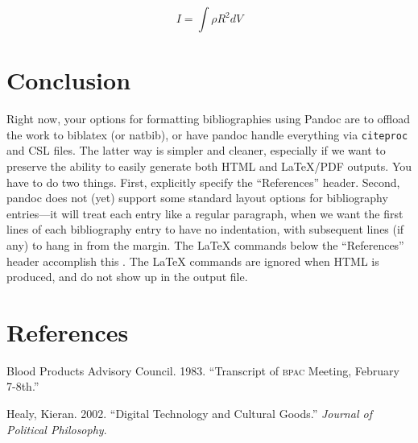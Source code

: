 \documentclass[11pt,article,oneside]{memoir}
\begin{document}
\begin{equation}
I = \int \rho R^{2} dV
\end{equation}

\section{Conclusion}\label{conclusion}

Right now, your options for formatting bibliographies using Pandoc are
to offload the work to biblatex (or natbib), or have pandoc handle
everything via \texttt{citeproc} and CSL files. The latter way is
simpler and cleaner, especially if we want to preserve the ability to
easily generate both HTML and LaTeX/PDF outputs. You have to do two
things. First, explicitly specify the ``References'' header. Second,
pandoc does not (yet) support some standard layout options for
bibliography entries---it will treat each entry like a regular
paragraph, when we want the first lines of each bibliography entry to
have no indentation, with subsequent lines (if any) to hang in from the
margin. The LaTeX commands below the ``References'' header accomplish
this . The LaTeX commands are ignored when HTML is produced, and do not
show up in the output file.

\section{References}\label{references}

\setlength{\parindent}{-0.2in} \setlength{\leftskip}{0.2in}
\setlength{\parskip}{8pt} \vspace*{-0.2in} \noindent

Blood Products Advisory Council. 1983. ``Transcript of \textsc{bpac}
Meeting, February 7-8th.''

Healy, Kieran. 2002. ``Digital Technology and Cultural Goods.''
\emph{Journal of Political Philosophy}.
\end{document}
